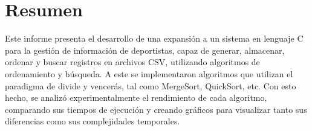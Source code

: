 \chapter*{Resumen}
Este informe presenta el desarrollo de una expansión a un sistema en lenguaje C para la gestión de información de deportistas, capaz de generar, almacenar, ordenar y buscar registros en archivos CSV, utilizando algoritmos de ordenamiento y búsqueda. A este se implementaron algoritmos que utilizan el paradigma de divide y vencerás, tal como MergeSort, QuickSort, etc. Con esto hecho, se analizó experimentalmente el rendimiento de cada algoritmo, comparando sus tiempos de ejecución y creando gráficos para visualizar tanto sus diferencias como sus complejidades temporales.
